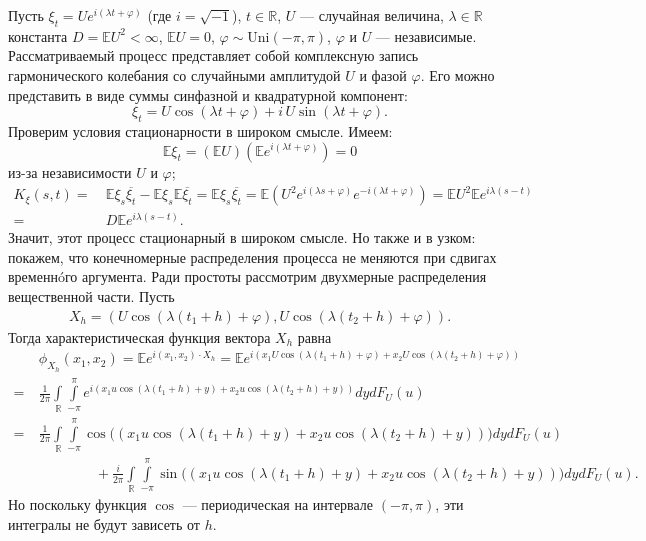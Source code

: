 \documentclass[10pt]{article}
\theoremstyle{boldnormal}
\newcommand{\R}{{\ensuremath{\mathbb{R}}}}
\newcommand{\EE}{{\ensuremath{\mathbb{E}}}}
\theoremstyle{boldremark}
\newenvironment{example}
  {\pushQED{\qed}\renewcommand{\qedsymbol}{$\triangle$}\examplex}
  {\popQED\endexamplex}
\begin{document}
\begin{example}\label{example:Uandphicomplex}
Пусть
$\xi_t = U e^{i(\lambda t + \varphi)}$ (где \(i=\sqrt{-1}\)), $t \in \mathbb{R}$,
$U$ --- случайная величина,
$\lambda\in \mathbb{R}$ константа
$D = \EE U^2 < \infty$,
$\EE U = 0$,
$\varphi \sim \text{Uni}(-\pi, \pi)$, $\varphi$ и $U$ --- независимые.
Рассматриваемый процесс представляет собой комплексную запись гармонического колебания
со случайными амплитудой \(U\) и фазой \(\varphi\).
Его можно представить в виде суммы синфазной и
квадратурной компонент:
\[
\xi_t = U\cos(\lambda t + \varphi) + i\,U\sin(\lambda t + \varphi).
\]
Проверим условия стационарности в широком смысле. Имеем: 
$$
\EE \xi_t = (\EE U) (\EE e^{i(\lambda t + \varphi)}) = 0
$$
из-за независимости \(U\) и \(\varphi\);
\begin{align*}
K_\xi(s,t) = & \ 
\EE \xi_s \overline{\xi_t} - \EE \xi_s \EE \overline{\xi_t} 
= \EE \xi_s \overline{\xi_t} 
= \EE(U^2 e^{i(\lambda s + \varphi)} e^{-i(\lambda t + \varphi)}) 
= \EE U^2 \EE e^{i\lambda(s-t)}
\\
= & \ D \EE e^{i\lambda(s-t)}.
\end{align*}
Значит, этот процесс стационарный в широком смысле. Но также и в узком: покажем,
что конечномерные распределения процесса не меняются при сдвигах временн\'oго аргумента.
Ради простоты рассмотрим двухмерные распределения вещественной части.
Пусть 
\begin{align*}
  X_h = (U\cos(\lambda(t_1+h)+\varphi),U\cos(\lambda(t_2+h)+\varphi)).
\end{align*}
Тогда характеристическая функция вектора \(X_h\) равна
\begin{align*}
  & \ \phi_{X_h}(x_1,x_2) = \EE e^{i(x_1,x_2)\cdot X_h} =  
   \EE e^{i(x_1 U\cos(\lambda(t_1+h)+\varphi) + x_2 U \cos(\lambda(t_2+h)+\varphi) )}
   \\
=  & \  \frac{1}{2\pi} \int\limits_{\R}
\int\limits_{-\pi}^{\pi}
e^{i(x_1 u\cos(\lambda(t_1+h)+y) + x_2u \cos(\lambda(t_2+h)+y))}
dy dF_U(u)
\\
 = & \  \frac{1}{2\pi}\int\limits_{\R}
\int\limits_{-\pi}^{\pi}
\cos\big((x_1 u\cos(\lambda(t_1+h)+y) + x_2u \cos(\lambda(t_2+h)+y))\big)
dy dF_U(u)
\\
& \ \qquad \qquad + 
\frac{i}{2\pi} \int\limits_{\R}
\int\limits_{-\pi}^{\pi}
\sin\big((x_1 u\cos(\lambda(t_1+h)+y) + x_2u \cos(\lambda(t_2+h)+y))\big)
dy dF_U(u).
\end{align*}
Но поскольку функция \(\cos\) --- периодическая на интервале \((-\pi,\pi)\),
эти интегралы не будут зависеть от \(h\).


\end{example}
\end{document}
